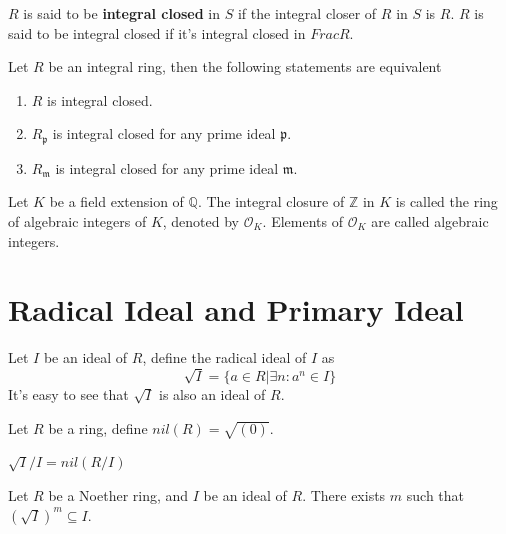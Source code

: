 \documentclass[12pt]{book}
\begin{document}
	\begin{definition}
		$R$ is said to be {\bf integral closed} in $S$ if the integral closer of $R$ in $S$ is $R$. $R$ is said to be integral closed if it's integral closed in $FracR$.
	\end{definition}
	
	\begin{lemma}
		Let $R$ be an integral ring, then the following statements are equivalent
		\begin{enumerate}
			\item $R$ is integral closed.
			\item $R_{\mathfrak p}$ is integral closed for any prime ideal $\mathfrak p$.
			\item $R_{\mathfrak m}$ is integral closed for any prime ideal $\mathfrak m$.
		\end{enumerate}
	\end{lemma}
	
	\begin{definition}
		Let $K$ be a field extension of $\mathbb Q$. The integral closure of $\mathbb Z$ in $K$ is called the ring of algebraic integers of $K$, denoted by $\mathcal O_K$. Elements of $\mathcal O_K$ are called algebraic integers.
	\end{definition}
	
	\section{Radical Ideal and Primary Ideal}
	
	\begin{definition}
		Let $I$ be an ideal of $R$, define the radical ideal of $I$ as
		\begin{equation}
			\sqrt I=\{a\in R|\exists n: a^n\in I \}
		\end{equation}
		It's easy to see that $\sqrt I$ is also an ideal of $R$.
	\end{definition}
	
	\begin{definition}
		Let $R$ be a ring, define $nil(R)=\sqrt{(0)}$.
	\end{definition}
	
	\begin{lemma}
		$\sqrt I/I=nil(R/I)$
	\end{lemma}
	
	\begin{lemma}
		Let $R$ be a Noether ring, and $I$ be an ideal of $R$. There exists $m$ such that $(\sqrt I)^m\subseteq I$.
	\end{lemma}
	
\end{document}
